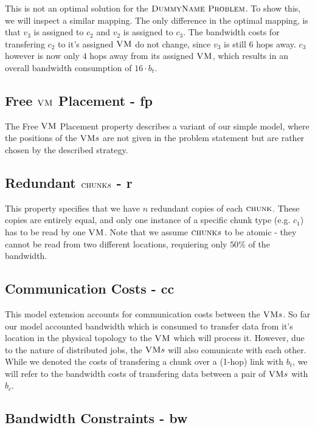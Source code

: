 This is not an optimal solution for the $\textsc{DummyName Problem}$. To show this, we will inspect a similar mapping. The only difference in the optimal mapping, is that $v_3$ is assigned to $c_2$ and $v_2$ is assigned to $c_3$. The bandwidth costs for transfering $c_2$ to it's assigned $\textsc{VM}$ do not change, since $v_3$ is still $6$ hops away. $c_3$ however is now only $4$ hops away from its assigned $\textsc{VM}$, which results in an overall bandwidth consumption of $16 \cdot b_t$.

\subsection{Free $\textsc{VM}$ Placement - fp}

The Free $\textsc{VM}$ Placement property describes a variant of our simple model, where the positions of the $\textsc{VM} s$ are not given in the problem statement but are rather chosen by the described strategy. 

\subsection{Redundant $\textsc{chunk} s$ - r}

This property specifies that we have $n$ redundant copies of each $\textsc{chunk}$. These copies are entirely equal, and only one instance of a specific chunk type (e.g. $c_1$) has to be read by one $\textsc{VM}$. Note that we assume $\textsc{chunk} s$ to be atomic - they cannot be read from two different locations, requiering only $50\%$ of the bandwidth.

\subsection{Communication Costs - cc}

This model extension accounts for communication costs between the $\textsc{VM} s$. So far our model accounted bandwidth which is consumed to transfer data from it's location in the physical topology to the $\textsc{VM}$ which will process it. However, due to the nature of distributed jobs, the $\textsc{VM} s$ will also comunicate with each other. While we denoted the costs of transfering a chunk over a (1-hop) link with $b_t$, we will refer to the bandwidth costs of transfering data between a pair of $\textsc{VM} s$ with $b_c$.

\subsection{Bandwidth Constraints - bw}

